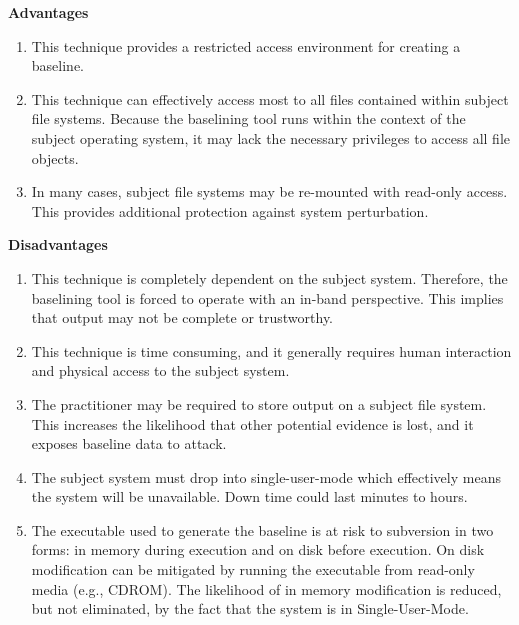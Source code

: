 \documentclass[10pt]{article}
\begin{document}
  \textbf{Advantages}

\begin{enumerate}

  \item
  This technique provides a restricted access environment for
  creating a baseline.

  \item
  This technique can effectively access most to all files contained
  within subject file systems.  Because the baselining tool runs
  within the context of the subject operating system, it may lack
  the necessary privileges to access all file objects.

  \item
  In many cases, subject file systems may be re-mounted with
  read-only access.  This provides additional protection against
  system perturbation.

\end{enumerate}

  \textbf{Disadvantages}

\begin{enumerate}

  \item
  This technique is completely dependent on the subject system.
  Therefore, the baselining tool is forced to operate with an
  in-band perspective.  This implies that output may not be complete
  or trustworthy.

  \item
  This technique is time consuming, and it generally requires human
  interaction and physical access to the subject system.

  \item
  The practitioner may be required to store output on a subject
  file system.  This increases the likelihood that other potential
  evidence is lost, and it exposes baseline data to attack.

  \item
  The subject system must drop into single-user-mode which effectively
  means the system will be unavailable.  Down time could last
  minutes to hours.

  \item
  The executable used to generate the baseline is at risk to
  subversion in two forms: in memory during execution and on disk
  before execution.  On disk modification can be mitigated by
  running the executable from read-only media (e.g., CDROM).  The
  likelihood of in memory modification is reduced, but not eliminated,
  by the fact that the system is in Single-User-Mode.

\end{enumerate}
\end{document}
